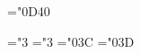 \let\varsigma        =\sigma %
\let\varrho          =\rho   %
\mathchardef\aleph   ="0D40

\def\rbrace          {\delimiter"5\hexsmfam 67A09 } \let\}=\rbrace
\def\lbrace          {\delimiter"4\hexsmfam 66A08 } \let\{=\lbrace

\mathchardef\leq     ="3 \let\le=\leq
\mathchardef\geq     ="3 \let\ge=\geq
\mathchardef\Re      ="0\hexsmfam 3C
\mathchardef\Im      ="0\hexsmfam 3D

\def\vert            {\delimiter"\hexsmfam 6A30C }
\def\backslash       {\delimiter"\hexsmfam 6E30F }

\endinput
